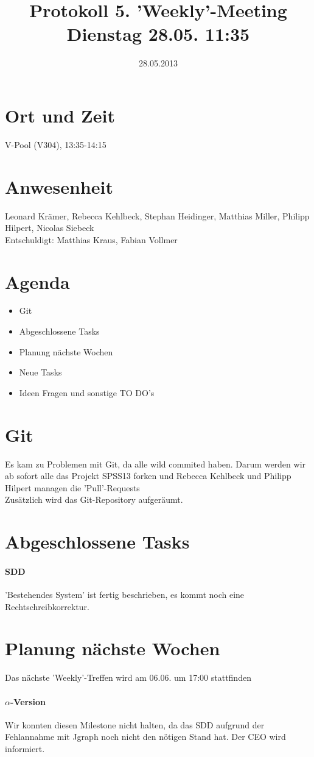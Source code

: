 \documentclass{scrartcl}
\date{28.05.2013}
\title{Protokoll 5. 'Weekly'-Meeting Dienstag 28.05. 11:35}
\begin{document}
\maketitle
\section{Ort und Zeit}
V-Pool (V304), 13:35-14:15 \\
\section{Anwesenheit}
Leonard Krämer, Rebecca Kehlbeck, Stephan Heidinger, Matthias Miller, Philipp Hilpert, Nicolas Siebeck \\ Entschuldigt: Matthias Kraus, Fabian Vollmer
\section{Agenda}
\begin{itemize}
\item Git
\item Abgeschlossene Tasks
\item Planung nächste Wochen
\item Neue Tasks
\item Ideen Fragen und sonstige TO DO's
\end{itemize}
\section{Git} Es kam zu Problemen mit Git, da alle wild commited haben. Darum werden wir ab sofort alle das Projekt SPSS13 forken und Rebecca Kehlbeck und Philipp Hilpert managen die 'Pull'-Requests \\ Zusätzlich wird das Git-Repository aufgeräumt.
\section{Abgeschlossene Tasks}
\paragraph{SDD} 'Bestehendes System' ist fertig beschrieben, es kommt noch eine Rechtschreibkorrektur.
\section{ Planung nächste Wochen}
Das nächste 'Weekly'-Treffen wird am 06.06. um 17:00 stattfinden
\paragraph{$\alpha$-Version} Wir konnten diesen Milestone nicht halten, da das SDD aufgrund der Fehlannahme mit Jgraph noch nicht den nötigen Stand hat. Der CEO wird informiert.
\end{document}
